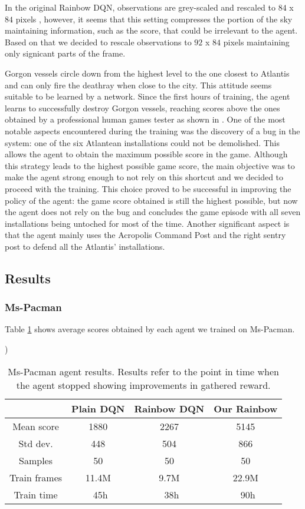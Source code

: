 \documentclass[10pt,twocolumn,letterpaper]{article}
\begin{document}
In the original Rainbow DQN, observations are grey-scaled and rescaled to $84$ x $84$ pixels \cite{DBLP:journals/corr/abs-1710-02298}, however, it seems that this setting compresses the portion of the sky maintaining information, such as the score, that could be irrelevant to the agent. Based on that we decided to rescale observations  to $92$ x $84$ pixels maintaining only signicant parts of the frame.

Gorgon vessels circle down from the highest level to the one closest to Atlantis and can only fire the deathray when close to the city. This attitude seems suitable to be learned by a network. Since the first hours of training, the agent learns to successfully destroy Gorgon vessels, reaching scores above the ones obtained by a professional human games tester as shown in \cite{humancontrol}.  One of the most notable aspects encountered during the training was the discovery of a bug in the system: one of the six Atlantean installations could not be demolished. This allows the agent to obtain the maximum possible score in the game. Although this strategy leads to the highest possible game score, the main objective was to make the agent strong enough to not rely on this shortcut and we decided to proceed with the training. This choice proved to be successful in improving the policy of the agent: the game score obtained is still the highest possible, but now the agent does not rely on the bug and concludes the game episode with all seven installations being untoched for most of the time. Another significant aspect is that the agent mainly uses the Acropolis Command Post and the right sentry post to defend all the Atlantis' installations. 

\subsection{Results}

\subsubsection{Ms-Pacman}

Table \ref{tab:pacman_results} shows average scores obtained by each agent we trained on Ms-Pacman.

\begin{table})
	\begin{center}
		\begin{tabular}{ |c|c|c|c| } 
			\hline
			 & Plain DQN & Rainbow DQN & Our Rainbow \\ 
			 \hline
			Mean score & 1880 & 2267 & 5145 \\
			Std dev. & 448 & 504 & 866 \\
			Samples & 50 & 50 & 50 \\
			Train frames & 11.4M & 9.7M & 22.9M \\
			Train time & ~45h & ~38h & ~90h \\
			\hline
		\end{tabular}
	\end{center}
	\caption{Ms-Pacman agent results. Results refer to the point in time when the agent stopped showing improvements in gathered reward.}
	\label{tab:pacman_results}
\end{table}
\end{document}
